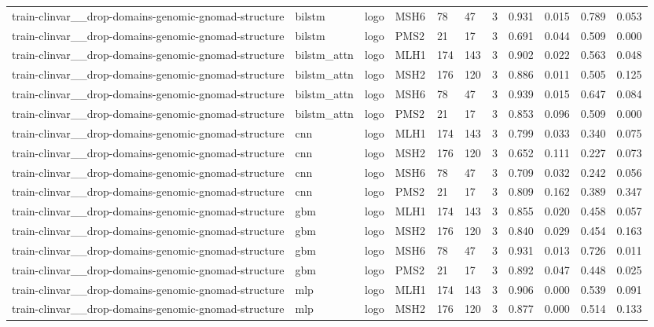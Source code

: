 \begin{table}[t]
\begin{tabular}{lllllllllll}
train-clinvar\_\_drop-domains-genomic-gnomad-structure & bilstm & logo & MSH6 & 78 & 47 & 3 & 0.931 & 0.015 & 0.789 & 0.053 \\
train-clinvar\_\_drop-domains-genomic-gnomad-structure & bilstm & logo & PMS2 & 21 & 17 & 3 & 0.691 & 0.044 & 0.509 & 0.000 \\
train-clinvar\_\_drop-domains-genomic-gnomad-structure & bilstm\_attn & logo & MLH1 & 174 & 143 & 3 & 0.902 & 0.022 & 0.563 & 0.048 \\
train-clinvar\_\_drop-domains-genomic-gnomad-structure & bilstm\_attn & logo & MSH2 & 176 & 120 & 3 & 0.886 & 0.011 & 0.505 & 0.125 \\
train-clinvar\_\_drop-domains-genomic-gnomad-structure & bilstm\_attn & logo & MSH6 & 78 & 47 & 3 & 0.939 & 0.015 & 0.647 & 0.084 \\
train-clinvar\_\_drop-domains-genomic-gnomad-structure & bilstm\_attn & logo & PMS2 & 21 & 17 & 3 & 0.853 & 0.096 & 0.509 & 0.000 \\
train-clinvar\_\_drop-domains-genomic-gnomad-structure & cnn & logo & MLH1 & 174 & 143 & 3 & 0.799 & 0.033 & 0.340 & 0.075 \\
train-clinvar\_\_drop-domains-genomic-gnomad-structure & cnn & logo & MSH2 & 176 & 120 & 3 & 0.652 & 0.111 & 0.227 & 0.073 \\
train-clinvar\_\_drop-domains-genomic-gnomad-structure & cnn & logo & MSH6 & 78 & 47 & 3 & 0.709 & 0.032 & 0.242 & 0.056 \\
train-clinvar\_\_drop-domains-genomic-gnomad-structure & cnn & logo & PMS2 & 21 & 17 & 3 & 0.809 & 0.162 & 0.389 & 0.347 \\
train-clinvar\_\_drop-domains-genomic-gnomad-structure & gbm & logo & MLH1 & 174 & 143 & 3 & 0.855 & 0.020 & 0.458 & 0.057 \\
train-clinvar\_\_drop-domains-genomic-gnomad-structure & gbm & logo & MSH2 & 176 & 120 & 3 & 0.840 & 0.029 & 0.454 & 0.163 \\
train-clinvar\_\_drop-domains-genomic-gnomad-structure & gbm & logo & MSH6 & 78 & 47 & 3 & 0.931 & 0.013 & 0.726 & 0.011 \\
train-clinvar\_\_drop-domains-genomic-gnomad-structure & gbm & logo & PMS2 & 21 & 17 & 3 & 0.892 & 0.047 & 0.448 & 0.025 \\
train-clinvar\_\_drop-domains-genomic-gnomad-structure & mlp & logo & MLH1 & 174 & 143 & 3 & 0.906 & 0.000 & 0.539 & 0.091 \\
train-clinvar\_\_drop-domains-genomic-gnomad-structure & mlp & logo & MSH2 & 176 & 120 & 3 & 0.877 & 0.000 & 0.514 & 0.133 \\

\end{tabular}
\end{table}

